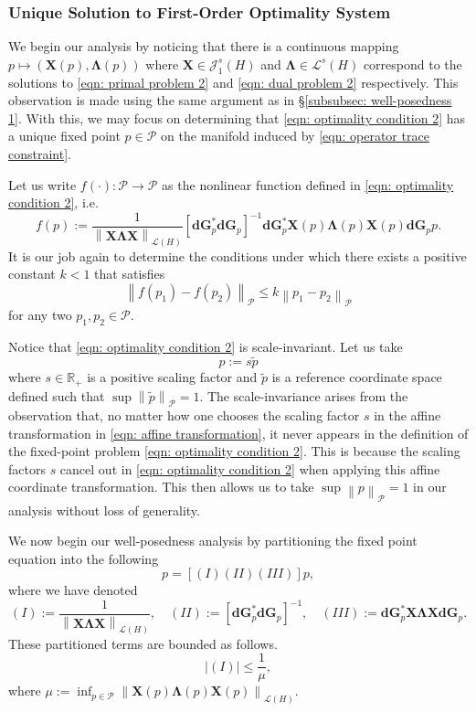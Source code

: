 \documentclass{amsart}
\newcommand{\sL}{\mathscr L}
\newcommand{\sJ}{\mathscr J}
\newcommand{\p}[1]{\left( {#1} \right)}
\newcommand{\norm}[1]{\left\| #1 \right\|}
\newcommand{\br}[1]{\left[ #1 \right]}
\newcommand{\sP}{\mathcal{P}}
\newcommand{\bX}{\mathbf X}
\newcommand{\bG}{\mathbf G}
\newcommand{\bLambda}{\boldsymbol{\Lambda}}
\newcommand{\bd}{\mathbf d}
\begin{document}
\subsubsection{Unique Solution to First-Order Optimality System}
We begin our analysis by noticing that there is a continuous mapping $p \mapsto\p{\bX(p), \bLambda(p)}$ where $\bX \in \sJ_1^s(H)$ and $\bLambda\in\sL^s(H)$ correspond to the solutions to \eqref{eqn: primal problem 2} and \eqref{eqn: dual problem 2} respectively. This observation is made using the same argument as in \S\ref{subsubsec: well-posedness 1}. With this, we may focus on determining that \eqref{eqn: optimality condition 2} has a unique fixed point $p \in \sP$ on the manifold induced by \eqref{eqn: operator trace constraint}. 

Let us write $f(\cdot): \sP \rightarrow \sP$ as the nonlinear function defined in \eqref{eqn: optimality condition 2}, i.e.
$$
    f(p) := \frac{1}{\norm{\bX\bLambda\bX}_{\sL(H)}}\br{\bd\bG_p^*\bd\bG_p}^{-1} \bd\bG_p^* \bX(p)\bLambda(p)\bX(p)\bd\bG_p p.
$$
It is our job again to determine the conditions under which there exists a positive constant $k < 1$ that satisfies
$$
    \norm{f(p_1) - f(p_2)}_{\sP} \leq k \norm{p_1 - p_2}_{\sP}
$$
for any two $p_1, p_2 \in \sP$. 

Notice that \eqref{eqn: optimality condition 2} is scale-invariant. Let us take 
\begin{equation} \label{eqn: affine transformation}
p:= s\widetilde p
\end{equation}
where $s\in \mathbb R_+$ is a positive scaling factor and $\widetilde p$ is a reference coordinate space defined such that $\sup \norm{\widetilde p}_\sP = 1$. The scale-invariance arises from the observation that, no matter how one chooses the scaling factor $s$ in the affine transformation in \eqref{eqn: affine transformation}, it never appears in the definition of the fixed-point problem \eqref{eqn: optimality condition 2}. This is because the scaling factors $s$ cancel out in \eqref{eqn: optimality condition 2} when applying this affine coordinate transformation. This then allows us to take $\sup \norm{p}_{\sP} = 1$ in our analysis without loss of generality. 

We now begin our well-posedness analysis by partitioning the fixed point equation into the following
$$
    p = \br{(I)(II)(III)}p,
$$
where we have denoted
$$
    (I) := \frac{1}{\norm{\bX\bLambda\bX}_{\sL(H)}}, \quad
    (II) := \br{\bd\bG^*_p\bd\bG_p}^{-1}, \quad 
    (III) := \bd\bG_p^*\bX\bLambda\bX\bd\bG_p.
$$
These partitioned terms are bounded as follows. 
\begin{equation}
    |(I)| \leq \frac{1}{\mu},
\end{equation}
where $\mu := \inf_{p \in \sP} \norm{\bX(p)\bLambda(p)\bX(p)}_{\sL(H)}$. 
\end{document}
